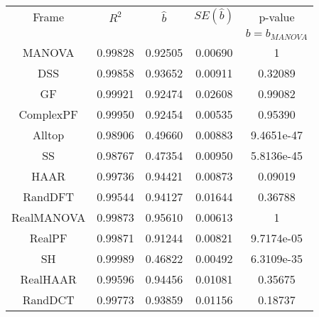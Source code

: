 \begin{tabular}{|c|c|c|c|c|}\hline 
Frame & $R^2$& $\hat{b}$ & $SE(\hat{b})$ & p-value \\
 & & & & $b=b_{MANOVA}$\\ \hline 
MANOVA & 0.99828 & 0.92505 & 0.00690 & 1 \\ 
DSS & 0.99858 & 0.93652 & 0.00911 & 0.32089 \\ 
GF & 0.99921 & 0.92474 & 0.02608 & 0.99082  \\ 
ComplexPF & 0.99950 & 0.92454 & 0.00535 & 0.95390  \\ 
Alltop & 0.98906 & 0.49660 & 0.00883 & 9.4651e-47  \\ 
SS & 0.98767 & 0.47354 & 0.00950 & 5.8136e-45  \\ 
\hline 
HAAR & 0.99736 & 0.94421 & 0.00873 & 0.09019  \\ 
RandDFT & 0.99544 & 0.94127 & 0.01644 & 0.36788  \\ 
\hline 
\hline 
RealMANOVA & 0.99873 & 0.95610 & 0.00613 & 1 \\ 
RealPF & 0.99871 & 0.91244 & 0.00821 & 9.7174e-05  \\ 
SH & 0.99989 & 0.46822 & 0.00492 & 6.3109e-35  \\ 
\hline 
RealHAAR & 0.99596 & 0.94456 & 0.01081 & 0.35675  \\ 
RandDCT & 0.99773 & 0.93859 & 0.01156 & 0.18737  \\ 
\hline 
\end{tabular}
